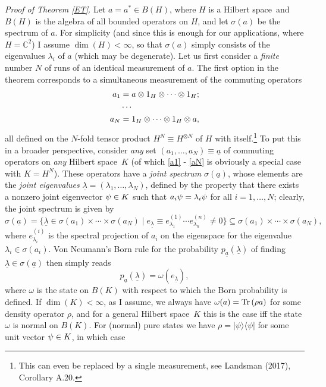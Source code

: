 \documentclass[12pt]{article}
\numberwithin{equation}{section}
\newcommand{\er}{\eqref}
\newcommand{\ul}{\underline}
\newcommand{\ot}{\otimes}
\newcommand{\la}{\langle} \newcommand{\ra}{\rangle}
\newcommand{\x}{\times}
\newcommand{\Hs}{Hilbert space} \newcommand{\Bs}{Banach space}
\newcommand{\lm}{\lambda} \newcommand{\Lm}{\Lambda}
\newcommand{\rh}{\rho} \newcommand{\sg}{\sigma}
\newcommand{\om}{\omega} \newcommand{\Om}{\Omega}
\newcommand{\Tr}{\mbox{\rm Tr}\,}
\newcommand{\C}{{\mathbb C}}
\begin{document}
  \emph{Proof of Theorem \ref{ET}}.
Let $a=a^*\in B(H)$, where $H$ is a \Hs\  and $B(H)$ is the algebra of all bounded operators on $H$, and let $\sg(a)$ be the spectrum of $a$. For simplicity (and since this is enough for our applications, where $H=\C^2$) I assume $\dim(H)<\infty$, so that $\sg(a)$ simply consists of the eigenvalues $\lm_i$ of $a$ (which may be degenerate). Let us first consider a \emph{finite} number $N$ of runs of an identical measurement of $a$.
The first option in the theorem corresponds to a simultaneous measurement of the commuting operators 
\begin{align}
a_1&=a\ot 1_H\ot\cdots\ot 1_H; \label{a1} \\
& \cdots \nn \\
a_N &=1_H\ot\cdots\ot 1_H\ot a, \label{aN}
\end{align}
all defined on the $N$-fold tensor product $H^N\equiv H^{\ot N}$ of $H$ with itself.\footnote{This can even be replaced by a single measurement, see Landsman (2017), Corollary A.20.}  To put this in a broader perspective,  consider \emph{any} set $(a_1, \ldots, a_N)\equiv\ul{a}$ of commuting operators on \emph{any} \Hs\ $K$ (of which \er{a1} - \er{aN} is obviously a special case with $K=H^N$).
These operators have a \emph{joint spectrum} $\sg(\ul{a})$, whose elements are the \emph{joint eigenvalues} $\ul{\lm}=(\lm_1, \ldots, \lm_N)$, defined by the property that there exists a nonzero joint eigenvector $\psi\in K$ such that $a_i\ps=\lm_i\ps$ for all $i=1, \ldots, N$; clearly, the joint spectrum is given by
\begin{equation}
\sg(\ul{a})=\{\ul{\lm}\in
\sg(a_1)\x\cdots\x\sg(a_N)\mid e_{\ul{\lm}}\equiv e^{(1)}_{\lm_1}\cdots e^{(n)}_{\lm_n} \neq 0\} \subseteq \sg(a_1)\x\cdots\x\sg(a_N), \label{21}
\end{equation}
where $e^{(i)}_{\lm_i}$ is the spectral projection of $a_i$ on the eigenspace for the eigenvalue $\lm_i\in\sg(a_i)$.
Von Neumann's Born rule for the probability $p_{\ul{a}}(\ul{\lm})$ of finding $\ul{\lm}\in\sg(\ul{a})$ then simply reads 
\begin{equation}
p_{\ul{a}}(\ul{\lm})=\om(e_{\ul{\lm}}),\label{paQn}
\end{equation}
 where $\om$ is the state on $B(K)$ with respect to which the Born probability is defined. If $\dim(K)<\infty$, as I assume, we always have $\om(a)=\Tr(\rh a)$ for some density operator $\rh$, and for a  general \Hs\ $K$ this is the case iff the state $\om$ is normal on $B(K)$. For (normal) pure states we have $\rh=|\psi\ra\la\psi|$ for some unit vector $\psi\in K$, in which case
\end{document}
